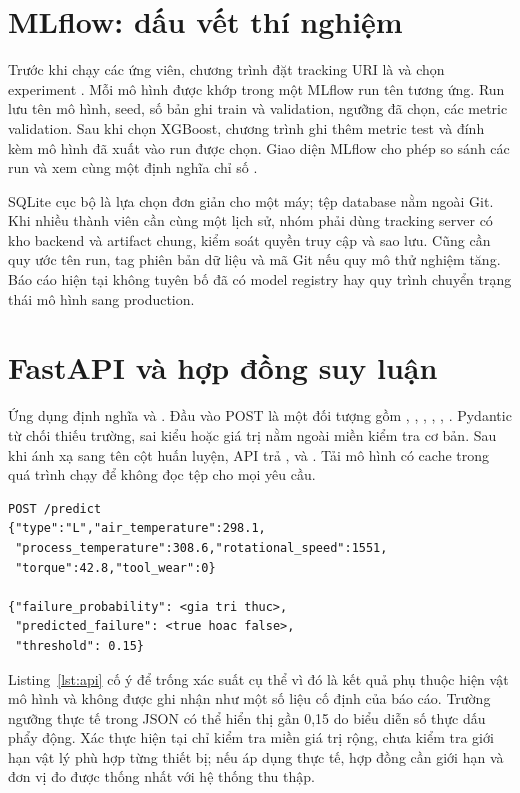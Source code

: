 \section{MLflow: dấu vết thí nghiệm}
Trước khi chạy các ứng viên, chương trình đặt tracking URI là  và chọn experiment . Mỗi mô hình được khớp trong một MLflow run tên tương ứng. Run lưu tên mô hình, seed, số bản ghi train và validation, ngưỡng đã chọn, các metric validation. Sau khi chọn XGBoost, chương trình ghi thêm metric test và đính kèm mô hình đã xuất vào run được chọn. Giao diện MLflow cho phép so sánh các run và xem cùng một định nghĩa chỉ số \cite{mlflow}.

SQLite cục bộ là lựa chọn đơn giản cho một máy; tệp database nằm ngoài Git. Khi nhiều thành viên cần cùng một lịch sử, nhóm phải dùng tracking server có kho backend và artifact chung, kiểm soát quyền truy cập và sao lưu. Cũng cần quy ước tên run, tag phiên bản dữ liệu và mã Git nếu quy mô thử nghiệm tăng. Báo cáo hiện tại không tuyên bố đã có model registry hay quy trình chuyển trạng thái mô hình sang production.

\section{FastAPI và hợp đồng suy luận}
Ứng dụng định nghĩa  và . Đầu vào POST là một đối tượng gồm , , , , , . Pydantic từ chối thiếu trường, sai kiểu hoặc giá trị nằm ngoài miền kiểm tra cơ bản. Sau khi ánh xạ sang tên cột huấn luyện, API trả ,  và . Tải mô hình có cache trong quá trình chạy để không đọc tệp cho mọi yêu cầu.

\begin{lstlisting}[language={},caption={Ví dụ yêu cầu và phản hồi API},label={lst:api}]
POST /predict
{"type":"L","air_temperature":298.1,
 "process_temperature":308.6,"rotational_speed":1551,
 "torque":42.8,"tool_wear":0}

{"failure_probability": <gia tri thuc>,
 "predicted_failure": <true hoac false>,
 "threshold": 0.15}
\end{lstlisting}
Listing~\ref{lst:api} cố ý để trống xác suất cụ thể vì đó là kết quả phụ thuộc hiện vật mô hình và không được ghi nhận như một số liệu cố định của báo cáo. Trường ngưỡng thực tế trong JSON có thể hiển thị gần 0,15 do biểu diễn số thực dấu phẩy động. Xác thực hiện tại chỉ kiểm tra miền giá trị rộng, chưa kiểm tra giới hạn vật lý phù hợp từng thiết bị; nếu áp dụng thực tế, hợp đồng cần giới hạn và đơn vị đo được thống nhất với hệ thống thu thập.

